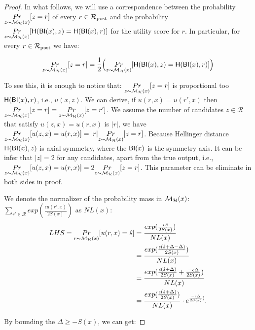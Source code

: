 \documentclass[sigconf]{acmart}
\begin{document}
\begin{proof}

In what follows, we will use a correspondence between the probability
 $\underset{z \thicksim \mathcal{M}_{\mathcal{H}}(x)}{Pr}[z = r]$ of every
 $r\in\mathcal{R}_{\textup{post}}$ and the probability 
 $\underset{z \thicksim \mathcal{M}_{\mathcal{H}}(x)}{Pr}[\mathsf{H}(\mathsf{BI}(x),z) =
 \mathsf{H}(\mathsf{BI}(x),r)]$ for the utility score for $r$. In particular, for every
 $r\in\mathcal{R}_{\textup{post}}$ we have:

$$
\underset{z \thicksim \mathcal{M}_{\mathcal{H}}(x)}{Pr}[z = r]=
\frac{1}{2}\Big (\underset{z \thicksim \mathcal{M}_{\mathcal{H}}(x)}{Pr}[\mathsf{H}(\mathsf{BI}(x),z) =
 \mathsf{H}(\mathsf{BI}(x),r)]\Big )
$$

To see this, it is enough to notice that: $\underset{z \thicksim \mathcal{M}_{\mathcal{H}}(x)}{Pr}[z = r]$ is proportional too $\mathsf{H}(\mathsf{BI}(x),r)$, i.e., $u(x,z)$. We can derive, if $u(r,x) = u(r',x)$ then $\underset{z \thicksim \mathcal{M}_{\mathcal{H}}(x)}{Pr}[z = r] = \underset{z \thicksim \mathcal{M}_{\mathcal{H}}(x)}{Pr}[z = r']$. We assume the number of candidates $z \in \mathcal{R}$ that satisfy $u(z,x) = u(r,x)$ is $|r|$, we have  $\underset{z \thicksim \mathcal{M}_{\mathcal{H}}(x)}{Pr}[u(z,x) = u(r,x)] = |r| \underset{z \thicksim \mathcal{M}_{\mathcal{H}}(x)}{Pr}[z = r]$. Because Hellinger distance  $\mathsf{H}(\mathsf{BI}(x),z)$ is axial symmetry, where the $\mathsf{BI}(x)$ is the symmetry axis. It can be infer that $|z| = 2$ for any candidates, apart from the true output, i.e., $\underset{z \thicksim \mathcal{M}_{\mathcal{H}}(x)}{Pr}[u(z,x) = u(r,x)] = 2 \underset{z \thicksim \mathcal{M}_{\mathcal{H}}(x)}{Pr}[z = r]$. This parameter can be eliminate in both sides in proof.

We denote the normalizer of the probability mass in $\mathcal{M}_{\mathcal{H}}(x)$: $\sum_{r' \in \mathcal{R}}exp(\frac{\epsilon u(r',x)}{2 S(x)})$ as $NL(x)$:
\begin{equation*}
\begin{split}
LHS 
  = \underset{r \thicksim \mathcal{M}_{\mathcal{H}}(x)}{Pr}[u(r,x) = \hat{s}]
& = \frac{exp(\frac{\epsilon \hat{s}}{2 S(x)})}{NL(x)}\\
& = \frac{exp(\frac{\epsilon (\hat{s} + \Delta - \Delta)}{2 S(x)})}{NL(x)}\\
& = \frac{exp(\frac{\epsilon (\hat{s} + \Delta)}{2 S(x)} + \frac{- \epsilon \Delta}{2 S(x)})}{NL(x)}\\
& = \frac{exp(\frac{\epsilon (\hat{s} + \Delta)}{2 S(x)})}{NL(x)} \cdot e^{\frac{- \epsilon \Delta}{2 S(x)})}.\\
\end{split}
\end{equation*}

By bounding the $\Delta \geq -S(x)$, we can get:


\end{proof}
\end{document}

